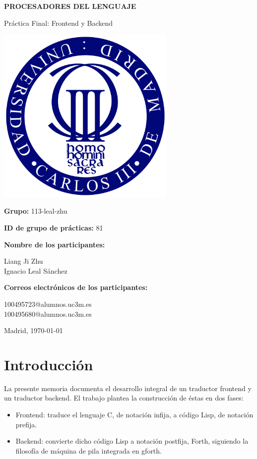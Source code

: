 \documentclass[12pt,a4paper]{article}
\begin{document}
\begin{titlepage}
    \centering
    \vspace*{2cm}
    {\LARGE\textbf{PROCESADORES DEL LENGUAJE}\par}
    \vspace{1cm}
    {\Large Práctica Final: Frontend y Backend\par}
    \vfill
    \includegraphics[width=0.65\textwidth]{logo_universidad.png}
    \vfill
    {\large\textbf{Grupo:} 113-leal-zhu\par}
    {\large\textbf{ID de grupo de prácticas:} 81\par}
    \vspace{1cm}
    {\large\textbf{Nombre de los participantes:}\par}
    {\normalsize Liang Ji Zhu \\ Ignacio Leal Sánchez\par}
    {\large\textbf{Correos electrónicos de los participantes:}\par}
    {\normalsize 100495723@alumnos.uc3m.es \\ 100495680@alumnos.uc3m.es\par}
    \vfill
    {\large Madrid, \today\par}
\end{titlepage}

\clearpage
\tableofcontents
\clearpage

\section{Introducción}
\noindent La presente memoria documenta el desarrollo integral de un traductor frontend y un traductor backend. 
El trabajo plantea la construcción de éstas en dos fases:
\begin{itemize}
    \item Frontend: traduce el lenguaje C, de notación infija, a código Lisp, de notación prefija.
    \item Backend: convierte dicho código Lisp a notación postfija, Forth, siguiendo la filosofía de máquina de pila integrada en gforth.
\end{itemize}
\end{document}
